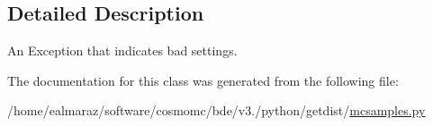 \subsection{Detailed Description}
\begin{DoxyVerb}An Exception that indicates bad settings.
\end{DoxyVerb}
 

The documentation for this class was generated from the following file\+:\begin{DoxyCompactItemize}
\item 
/home/ealmaraz/software/cosmomc/bde/v3./python/getdist/\mbox{\hyperlink{mcsamples_8py}{mcsamples.\+py}}\end{DoxyCompactItemize}

